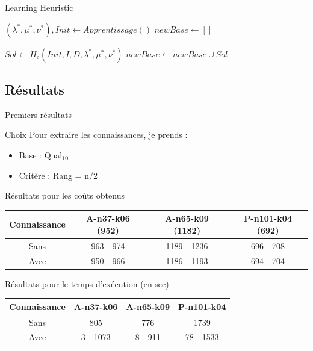 \documentclass{beamer}
\begin{document}
\begin{frame}{Learning Heuristic}
\begin{algorithm}[H]
\DontPrintSemicolon %
$(\lambda^*,\mu^*,\nu^*), Init \gets Apprentissage()$\;
$newBase \gets []$\;
 {
	 {
		
		 {
			$Sol \gets H_c(Init,I,D,\lambda^*,\mu^*,\nu^*)$\;
			$newBase \gets newBase \cup Sol$\;
			}	
		
	}
}
\;
\end{algorithm}
\end{frame}

\subsection{Résultats}

\begin{frame}{Premiers résultats}
\begin{block}{Choix}
Pour extraire les connaissances, je prends :
\begin{itemize}
\item Base : Qual$_{10}$
\item Critère : Rang = n/2
\end{itemize}
\end{block}

Résultats pour les coûts obtenus
\begin{tabular}{|c|c|c|c|}
   \hline
   Connaissance & A-n37-k06 (952) & A-n65-k09 (1182) & P-n101-k04 (692)  \\
   \hline
   Sans & 963 - 974  & 1189 - 1236 & 696 - 708   \\
   \hline
   Avec & 950 - 966 & 1186 - 1193 & 694 - 704  \\
   \hline
\end{tabular}

Résultats pour le temps d'exécution (en sec)
\begin{tabular}{|c|c|c|c|}
   \hline
   Connaissance  & A-n37-k06 & A-n65-k09 & P-n101-k04  \\
   \hline
   Sans & 805  & 776 &  1739  \\
   \hline
   Avec & 3 - 1073 & 8 - 911 & 78 - 1533  \\
   \hline
\end{tabular}

\end{frame}
\end{document}
